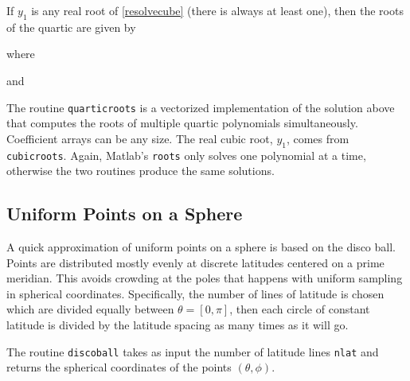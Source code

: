 If $y_1$ is any real root of \eqref{resolvecube} (there is always at least one), then the roots of the quartic are given by 

\noindent where

and


The routine \texttt{quarticroots} is a vectorized implementation of the solution above that computes the roots of multiple quartic polynomials simultaneously. Coefficient arrays can be any size. The real cubic root, $y_1$, comes from \texttt{cubicroots}. Again, Matlab's \texttt{roots} only solves one polynomial at a time, otherwise the two routines produce the same solutions.

{\footnotesize
{}
}

\clearpage
\newpage
\subsection{Uniform Points on a Sphere}

A quick approximation of uniform points on a sphere is based on the disco ball. Points are distributed mostly evenly at discrete latitudes centered on a prime meridian. This avoids crowding at the poles that happens with uniform sampling in spherical coordinates. Specifically, the number of lines of latitude is chosen which are divided equally between $\theta = [0, \pi]$, then each circle of constant latitude is divided by the latitude spacing as many times as it will go.

The routine \texttt{discoball} takes as input the number of latitude lines \texttt{nlat} and returns the spherical coordinates of the points $(\theta,\phi)$.  

